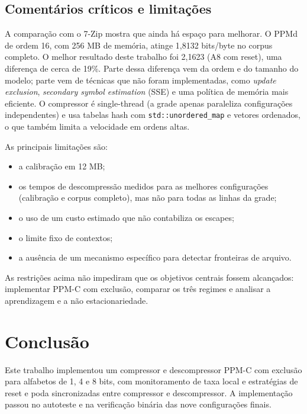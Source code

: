 \documentclass[12pt,a4paper]{article}
\begin{document}
\subsection{Coment\'arios cr\'iticos e limita\c{c}\~oes}
A compara\c{c}\~ao com o 7-Zip mostra que ainda h\'a espa\c{c}o para melhorar. O PPMd
de ordem 16, com 256 MB de mem\'oria, atinge 1,8132 bits/byte no corpus completo.
O melhor resultado deste trabalho foi 2,1623 (A8 com reset), uma diferen\c{c}a de
cerca de 19\%. Parte dessa diferen\c{c}a vem da ordem e do tamanho do modelo; parte
vem de t\'ecnicas que n\~ao foram implementadas, como \emph{update exclusion},
\emph{secondary symbol estimation} (SSE) e uma pol\'itica de mem\'oria mais
eficiente. O compressor \'e single-thread (a grade apenas paraleliza
configura\c{c}\~oes independentes) e usa tabelas hash com
\texttt{std::unordered\_map} e vetores ordenados, o que tamb\'em limita a velocidade
em ordens altas.

As principais limita\c{c}\~oes s\~ao:
\begin{itemize}[leftmargin=*]
  \item a calibra\c{c}\~ao em 12 MB;
  \item os tempos de descompress\~ao medidos para as melhores configura\c{c}\~oes
        (calibra\c{c}\~ao e corpus completo), mas n\~ao para todas as linhas da
        grade;
  \item o uso de um custo estimado que n\~ao contabiliza os escapes;
  \item o limite fixo de contextos;
  \item a aus\^encia de um mecanismo espec\'ifico para detectar fronteiras de
        arquivo.
\end{itemize}
As restri\c{c}\~oes acima n\~ao impediram que os objetivos centrais fossem
alcan\c{c}ados: implementar PPM-C com exclus\~ao, comparar os tr\^es regimes e
analisar a aprendizagem e a n\~ao estacionariedade.

\section{Conclus\~ao}
Este trabalho implementou um compressor e descompressor PPM-C com exclus\~ao para
alfabetos de 1, 4 e 8 bits, com monitoramento de taxa local e estrat\'egias de reset
e poda sincronizadas entre compressor e descompressor. A implementa\c{c}\~ao passou
no autoteste e na verifica\c{c}\~ao bin\'aria das nove configura\c{c}\~oes finais.
\end{document}
